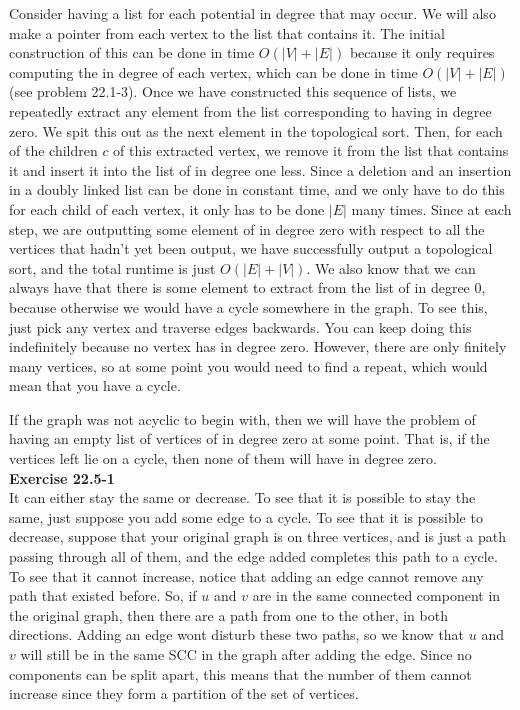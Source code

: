 \documentclass{article}
\begin{document}
Consider having a list for each potential in degree that may occur. We will also make a pointer from each vertex to the list that contains it. The initial construction of this can be done in time $O(|V|+|E|)$ because it only requires computing the in degree of each vertex, which can be done in time $O(|V|+|E|)$ (see problem 22.1-3). Once we have constructed this sequence of lists, we repeatedly extract any element from the list corresponding to having in degree zero. We spit this out as the next element in the topological sort. Then, for each of the children $c$ of this extracted vertex, we remove it from the list that contains it and insert it into the list of in degree one less. Since a deletion and an insertion in a doubly linked list can be done in constant time, and we only have to do this for each child of each vertex, it only has to be done $|E|$ many times. Since at each step, we are outputting some element of in degree zero with respect to all the vertices that hadn't yet been output, we have successfully output a topological sort, and the total runtime is just $O(|E|+|V|)$. We also know that we can always have that there is some element to extract from the list of in degree 0, because otherwise we would have a cycle somewhere in the graph. To see this, just pick any vertex and traverse edges backwards. You can keep doing this indefinitely because no vertex has in degree zero. However, there are only finitely many vertices, so at some point you would need to find a repeat, which would mean that you have a cycle.

If the graph was not acyclic to begin with, then we will have the problem of having an empty list of vertices of in degree zero at some point. That is, if the vertices left lie on a cycle, then none of them will have in degree zero.\\

\noindent\textbf{Exercise 22.5-1}\\

It can either stay the same or decrease. To see that it is possible to stay the same, just suppose you add some edge to a cycle. To see that it is possible to decrease, suppose that your original graph is on three vertices, and is just a path passing through all of them, and the edge added completes this path to a cycle. To see that it cannot increase, notice that adding an edge cannot remove any path that existed before. So, if $u$ and $v$ are in the same connected component in the original graph, then there are a path from one to the other, in both directions. Adding an edge wont disturb these two paths, so we know that $u$ and $v$ will still be in the same SCC in the graph after adding the edge. Since no components can be split apart, this means that the number of them cannot increase since they form a partition of the set of vertices.\\
\end{document}
